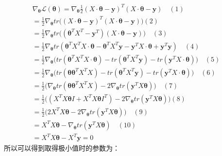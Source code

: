 \documentclass[UTF8]{article}
\begin{document}
\begin{equation}
\begin{aligned}
\nabla _{\boldsymbol{\theta}} \mathcal{L}(\boldsymbol{\theta}) = \nabla _{\boldsymbol{\theta}} \frac{1}{2}(X \cdot \boldsymbol{\theta}- \boldsymbol{y} )^{T} (X \cdot \boldsymbol{\theta} - \boldsymbol{y} ) \quad (1) \\
= \frac{1}{2} \nabla _{\boldsymbol{\theta}} tr\Big( (X \cdot \boldsymbol{\theta}- \boldsymbol{y} )^{T} (X \cdot \boldsymbol{\theta} - \boldsymbol{y} ) \Big) (2) \\
= \frac{1}{2} \nabla _{\boldsymbol{\theta}} tr\Big( (\boldsymbol{\theta}^{T} X^{T} - \boldsymbol{y}^{T} ) (X \cdot \boldsymbol{\theta} - \boldsymbol{y} ) \Big) \quad (3) \\
= \frac{1}{2} \nabla _{\boldsymbol{\theta}} tr( \boldsymbol{\theta}^{T} X^{T}X \cdot \boldsymbol{\theta} -  \boldsymbol{\theta}^{T} X^{T}\boldsymbol{y} -  \boldsymbol{y}^{T}X \cdot \boldsymbol{\theta} + \boldsymbol{y}^{T} \boldsymbol{y}) \quad (4) \\
=\frac{1}{2} \nabla _{\boldsymbol{\theta}} \Big( tr(\boldsymbol{\theta}^{T} X^{T}X \cdot \boldsymbol{\theta}) - tr(\boldsymbol{\theta}^{T} X^{T}\boldsymbol{y}) -tr( \boldsymbol{y}^{T}X \cdot \boldsymbol{\theta}) \Big) \quad (5) \\
= \frac{1}{2} \nabla _{\boldsymbol{\theta}} \Big( tr(\boldsymbol{\theta}\boldsymbol{\theta}^{T} X^{T}X) - tr(\boldsymbol{\theta}^{T} X^{T}\boldsymbol{y}) -tr( \boldsymbol{y}^{T}X \cdot \boldsymbol{\theta}) \Big) \quad (6) \\
=\frac{1}{2}  \Big( \nabla _{\boldsymbol{\theta}}tr(\boldsymbol{\theta}\boldsymbol{\theta}^{T} X^{T}X)  - 2 \nabla _{\boldsymbol{\theta}} tr( \boldsymbol{y}^{T}X \boldsymbol{\theta}) \Big) \quad (7) \\
= \frac{1}{2} \Big( (X^{T}X\boldsymbol{\theta}I + X^{T}X\boldsymbol{\theta}I^{T})-2\nabla _{\boldsymbol{\theta}} tr( \boldsymbol{y}^{T}X \boldsymbol{\theta}) \Big) (8) \\
= \frac{1}{2} \Big( 2X^{T}X\boldsymbol{\theta} -2\nabla _{\boldsymbol{\theta}} tr( \boldsymbol{y}^{T}X \boldsymbol{\theta}) \Big) \quad (9) \\
= X^{T}X\boldsymbol{\theta} - \nabla _{\boldsymbol{\theta}} tr( \boldsymbol{y}^{T}X \boldsymbol{\theta}) \quad (10) \\
= X^{T}X\boldsymbol{\theta} - X^{T}\boldsymbol{y}=0
\end{aligned}
\label{lrrn-min-sq-mul}
\end{equation}
所以可以得到取得极小值时的参数为：
\end{document}
